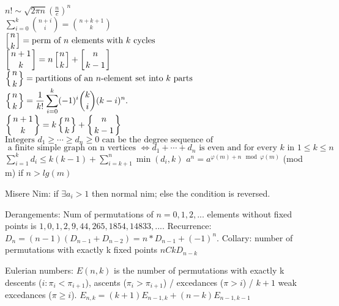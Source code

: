 $\displaystyle n!\sim {\sqrt {2\pi n}}\left({\frac {n}{e}}\right)^{n}$ \\
$\displaystyle \sum \limits_{i= 0}^k{n+i \choose i} = {n+k+1 \choose k}$ \\
${\displaystyle \left[{n \atop k}\right]} =\text{perm of }n \text{ elements with } k \text{ cycles}$ \\
${\displaystyle \left[{n+1 \atop k}\right]=n\left[{n \atop k}\right]+\left[{n \atop k-1}\right]}$ \\
${\displaystyle \left\{{n \atop k}\right\}}= \text{partitions of an }n\text{-element set into } k \text{ parts}$ \\
${\displaystyle \left\{{n \atop k}\right\}={\frac {1}{k!}}\sum _{i=0}^{k}(-1)^{i}{\binom {k}{i}}(k-i)^{n}.}$ \\
${\displaystyle \left\{{n+1 \atop k}\right\}=k\left\{{n \atop k}\right\}+\left\{{n \atop k-1}\right\}}$ \\
$\text {Integers } d_{1}\geq \cdots \geq d_{n} \geq 0 \text { can be the degree sequence of }$ \\
$\text { a finite simple graph on n vertices }\iff d_{1}+\cdots +d_{n} \text { is even and for every } k \text { in } 1\leq k\leq n $ \\
${\displaystyle \sum _{i=1}^{k}d_{i}\leq k(k-1)+\sum _{i=k+1}^{n}\min(d_{i},k)}$
$a^n = a^{\varphi(m)+n \mod \varphi(m)}$ (mod m) if $n > lg(m)$

Misere Nim: if $\exists a_i > 1$ then normal nim; else the condition is reversed.

Derangements: Num of permutations of $n=0,1,2,...$ elements without fixed points is
$1,0,1,2,9,44,265,1854,14833,...$. Recurrence: $D_n = (n-1)(D_{n-1}+D_{n-2}) = n*D_{n-1}+(-1)^n$.
Collary: number of permutations with exactly k fixed points $nCk D_{n-k}$

Eulerian numbers: $E(n,k)$ is the number of permutations with exactly k descents ($i:\pi_{i} < \pi_{i+1}$),
ascents ($\pi_i > \pi_{i+1}$) / excedances ($\pi > i$) / $k+1$ weak excedances ($\pi \geq i$).
$E_{n,k} = (k+1)E_{n-1,k} + (n-k)E_{n-1,k-1}$
